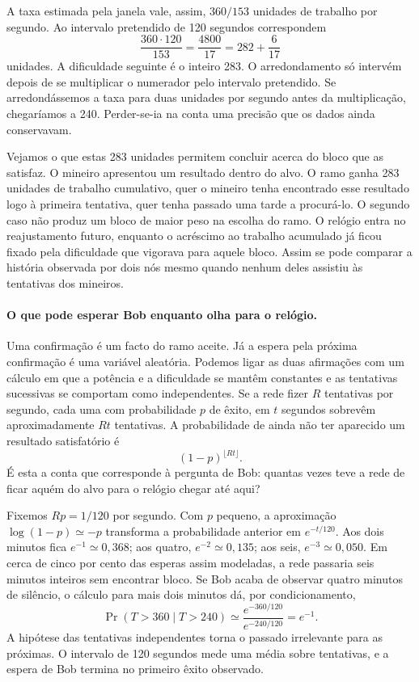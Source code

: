 A taxa estimada pela janela vale, assim, \(360/153\) unidades de
trabalho por segundo. Ao intervalo pretendido de 120 segundos
correspondem
\[
  \frac{360\cdot120}{153}=\frac{4800}{17}
                   =282+\frac{6}{17}
\]
unidades. A dificuldade seguinte é o inteiro 283. O arredondamento
só intervém depois de se multiplicar o numerador pelo intervalo
pretendido. Se arredondássemos a taxa para duas unidades por segundo
antes da multiplicação, chegaríamos a 240. Perder-se-ia na conta uma
precisão que os dados ainda conservavam.

Vejamos o que estas 283 unidades permitem concluir acerca do bloco que as
satisfaz. O mineiro apresentou um resultado dentro do alvo. O ramo ganha
283 unidades de trabalho cumulativo, quer o mineiro tenha encontrado esse
resultado logo à primeira tentativa, quer tenha passado uma tarde a
procurá-lo. O segundo caso não produz um bloco de maior peso na escolha
do ramo. O relógio entra no reajustamento futuro, enquanto o acréscimo ao
trabalho acumulado já ficou fixado pela dificuldade que vigorava para
aquele bloco. Assim se pode comparar a história observada por dois nós
mesmo quando nenhum deles assistiu às tentativas dos mineiros.

\paragraph{O que pode esperar Bob enquanto olha para o relógio.}
Uma confirmação é um facto do ramo aceite. Já a espera pela próxima
confirmação é uma variável aleatória. Podemos ligar as duas afirmações
com um cálculo em que a potência e a dificuldade se mantêm constantes
e as tentativas sucessivas se comportam como independentes. Se a rede
fizer \(R\) tentativas por segundo, cada uma com probabilidade \(p\) de
êxito, em \(t\) segundos sobrevêm aproximadamente \(Rt\) tentativas. A
probabilidade de ainda não ter aparecido um resultado satisfatório é
\[
        (1-p)^{\lfloor Rt\rfloor}.
\]
É esta a conta que corresponde à pergunta de Bob: quantas vezes teve a
rede de ficar aquém do alvo para o relógio chegar até aqui?

Fixemos \(Rp=1/120\) por segundo. Com \(p\) pequeno, a aproximação
\(\log(1-p)\simeq-p\) transforma a probabilidade anterior em
\(e^{-t/120}\). Aos dois minutos fica \(e^{-1}\simeq0{,}368\);
aos quatro, \(e^{-2}\simeq0{,}135\); aos seis,
\(e^{-3}\simeq0{,}050\). Em cerca de cinco por cento das esperas assim
modeladas, a rede passaria seis minutos inteiros sem encontrar bloco.
Se Bob acaba de observar quatro minutos de silêncio, o cálculo para
mais dois minutos dá, por condicionamento,
\[
 \Pr(T>360\mid T>240)
 \simeq\frac{e^{-360/120}}{e^{-240/120}}=e^{-1}.
\]
A hipótese das tentativas independentes torna o passado irrelevante
para as próximas. O intervalo de 120 segundos mede uma média sobre
tentativas, e a espera de Bob termina no primeiro êxito observado.

